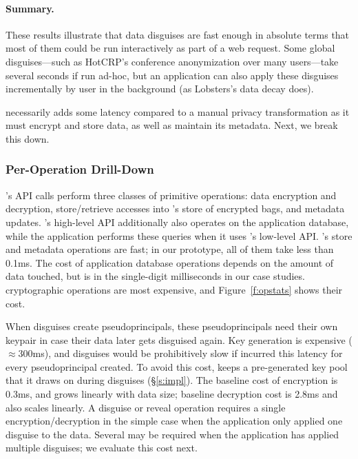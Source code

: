 \paragraph{Summary.}
%
These results illustrate that data disguises are fast enough in absolute terms
that most of them could be run interactively as part of a web request.
%
Some global disguises---such as HotCRP's conference anonymization over many
users---take several seconds if run ad-hoc, but an application can also apply
these disguises incrementally by user in the background (as Lobsters's data decay
does).
%

%
\sys necessarily adds some latency compared to a manual privacy transformation
as it must encrypt and store data, as well as maintain its metadata.
%
Next, we break this down.
%

\subsubsection{\sys Per-Operation Drill-Down}
%
\sys's API calls perform three classes of primitive operations: data encryption
and decryption, store/retrieve accesses into \sys's store of encrypted bags,
and metadata updates.
%
\sys's high-level API additionally also operates on the application database,
while the application performs these queries when it uses \sys's low-level API.
%
\sys's store and metadata operations are fast; in our prototype, all of them
take less than 0.1ms.
%
The cost of application database operations depends on the amount of data
touched, but is in the single-digit milliseconds in our case studies.
%
\sys cryptographic operations are most expensive, and Figure~\ref{f:opstats}
shows their cost.
%

%
When disguises create pseudoprincipals, these pseudoprincipals need their
own keypair in case their data later gets disguised again.
%
Key generation is expensive ($\approx$300ms), and disguises would be
prohibitively slow if \sys incurred this latency for every pseudoprincipal
created.
%
To avoid this cost, \sys keeps a pre-generated key pool that it draws on
during disguises (\S\ref{s:impl}).
%
%
The baseline cost of encryption is 0.3ms, and grows linearly with data
size; baseline decryption cost is 2.8ms and also scales linearly.
%
A disguise or reveal operation requires a single encryption/decryption in
the simple case when the application only applied one disguise to the
data.
%
Several may be required when the application has applied multiple
disguises; we evaluate this cost next.
%

